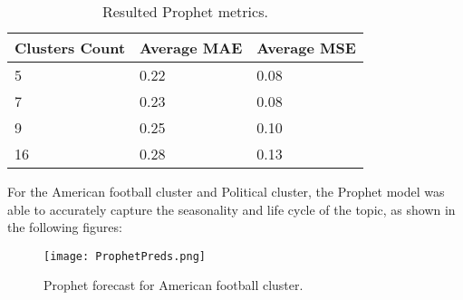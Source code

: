 \begin{table}[h]
\centering
\begin{tabular}{|l|l|l|}
\hline
\textbf{Clusters Count} & \textbf{Average MAE} & \textbf{Average MSE} \\ \hline
5                       & 0.22                 & 0.08                 \\ \hline
7                       & 0.23                 & 0.08                 \\ \hline
9                       & 0.25                 & 0.10                 \\ \hline
16                      & 0.28                 & 0.13                 \\ \hline
\end{tabular}
\caption{Resulted Prophet metrics.}
\label{tab:ProphetMetrics}
\end{table}

For the American football cluster and Political cluster, the Prophet model was able to accurately capture the seasonality and life cycle of the topic, as shown in the following figures:

\begin{figure}[h] 
    \centering
    \texttt{[image: ProphetPreds.png]}
    \label{fig:ProphetPreds}
    \caption{Prophet forecast for American football cluster.}
\end{figure}






